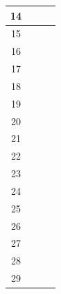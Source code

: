 \begin{table}[]
\begin{tabular}{|c|c|c|c|}
 		14 &                                                                                     &              &       \\ \hline
 		15 &                                                                                     &              &       \\ \hline
 		16 &                                                                                     &              &       \\ \hline
 		17 &                                                                                     &              &       \\ \hline
 		18 &                                                                                     &              &       \\ \hline
 		19 &                                                                                     &              &       \\ \hline
 		20 &                                                                                     &              &       \\ \hline
 		21 &                                                                                     &              &       \\ \hline
 		22 &                                                                                     &              &       \\ \hline
 		23 &                                                                                     &              &       \\ \hline
 		24 &                                                                                     &              &       \\ \hline
 		25 &                                                                                     &              &       \\ \hline
 		26 &                                                                                     &              &       \\ \hline
 		27 &                                                                                     &              &       \\ \hline
 		28 &                                                                                     &              &       \\ \hline
 		29 &                                                                                     &              &       \\ \hline

\end{tabular}
\end{table}
